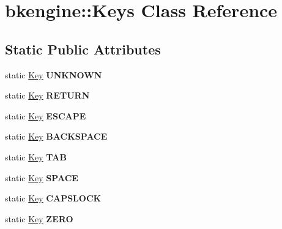 \hypertarget{classbkengine_1_1Keys}{}\section{bkengine\+:\+:Keys Class Reference}
\label{classbkengine_1_1Keys}
\subsection*{Static Public Attributes}
\begin{DoxyCompactItemize}
\item 
\mbox{\label{classbkengine_1_1Keys_addcb4b866148a29c66316aaad8bf6383}} 
static \hyperlink{classbkengine_1_1Key}{Key} {\bfseries U\+N\+K\+N\+O\+WN}
\item 
\mbox{\label{classbkengine_1_1Keys_a774f502aec51497a2e115f4b988eea27}} 
static \hyperlink{classbkengine_1_1Key}{Key} {\bfseries R\+E\+T\+U\+RN}
\item 
\mbox{\label{classbkengine_1_1Keys_aae120cdc1dd2c94e5a8d4d67f8144618}} 
static \hyperlink{classbkengine_1_1Key}{Key} {\bfseries E\+S\+C\+A\+PE}
\item 
\mbox{\label{classbkengine_1_1Keys_a97b56123f742970db534e9dc2f7f0026}} 
static \hyperlink{classbkengine_1_1Key}{Key} {\bfseries B\+A\+C\+K\+S\+P\+A\+CE}
\item 
\mbox{\label{classbkengine_1_1Keys_a33554518bac96b2f2b4441601bee36b4}} 
static \hyperlink{classbkengine_1_1Key}{Key} {\bfseries T\+AB}
\item 
\mbox{\label{classbkengine_1_1Keys_a2530f649d8ec413275a429e11e109596}} 
static \hyperlink{classbkengine_1_1Key}{Key} {\bfseries S\+P\+A\+CE}
\item 
\mbox{\label{classbkengine_1_1Keys_a06322734d3bb330a58ce47da5b7af579}} 
static \hyperlink{classbkengine_1_1Key}{Key} {\bfseries C\+A\+P\+S\+L\+O\+CK}
\item 
\mbox{\label{classbkengine_1_1Keys_a958a175e1b13f779c8e0f878066cd81a}} 
static \hyperlink{classbkengine_1_1Key}{Key} {\bfseries Z\+E\+RO}

\end{DoxyCompactItemize}
